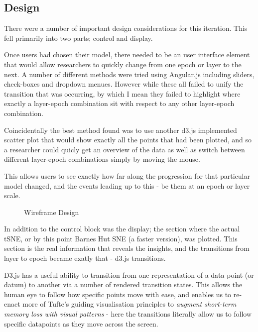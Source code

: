 \documentclass[a4paper,11pt,titlepage]{article}
\begin{document}
	\subsection{Design}	
	There were a number of important design considerations for this iteration. This fell primarily into two parts; control and display.
	\par 
	Once users had chosen their model, there needed to be an user interface element that would allow researchers to quickly change from one epoch or layer to the next. A number of different methods were tried using Angular.js including sliders, check-boxes and dropdown menues. However while these all failed to unify the transition that was occurring, by which I mean they failed to highlight where exactly a layer-epoch combination sit with respect to any other layer-epoch combination. 
	\par 
	Coincidentally the best method found was to use another d3.js implemented scatter plot that would show exactly all the points that had been plotted, and so a researcher could quicly get an overview of the data as well as switch between different layer-epoch combinations simply by moving the mouse. 
	\par 
	This allows users to see exactly how far along the progression for that particular model changed, and the events leading up to this - be them at an epoch or layer scale.  

	\begin{figure}[H]
    			\caption{Wireframe Design}%
	\end{figure}	
	
	In addition to the control block was the display; the section where the actual tSNE, or by this point Barnes Hut SNE (a faster version), was plotted. This section is the real information that reveals the insights, and the transitions from layer to epoch became exatly that - d3.js transitions. 
	\par 
	D3.js has a useful ability to transition from one representation of a data point (or datum) to another via a number of rendered transition states. This allows the human eye to follow how specific points move with ease, and enables us to re-enact more of Tufte's guiding visualisation principles to \textit{augment short-term memory loss with visual patterns} - here the transitions literally allow us to follow specific datapoints as they move across the screen.
	\par 
\end{document}
